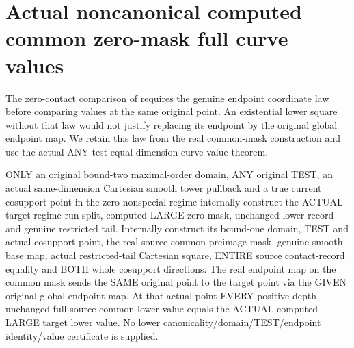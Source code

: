 \section{Actual noncanonical computed common zero-mask full curve values}

The zero-contact comparison of \cite[Section~5, Step~I.B]{bierstone-milman08-functoriality}
requires the genuine endpoint coordinate law before comparing values at
the same original point. An existential lower square without that law
would not justify replacing its endpoint by the original global endpoint
map. We retain this law from the real common-mask construction and use
the actual ANY-test equal-dimension curve-value theorem.

\begin{theorem}
\label{hir:original-any-test-zero-common-curve-full-values}
\leanok
ONLY an original bound-two maximal-order domain, ANY original TEST, an
actual same-dimension Cartesian smooth tower pullback and a true current
cosupport point in the zero nonspecial regime internally construct the
ACTUAL target regime-run split, computed LARGE zero mask, unchanged lower
record and genuine restricted tail. Internally construct its bound-one
domain, TEST and actual cosupport point, the real source common preimage
mask, genuine smooth base map, actual restricted-tail Cartesian square,
ENTIRE source contact-record equality and BOTH whole cosupport directions.
The real endpoint map on the common mask sends the SAME original point
to the target point via the GIVEN original global endpoint map. At that
actual point EVERY positive-depth unchanged full source-common lower
value equals the ACTUAL computed LARGE target lower value. No lower
canonicality/domain/TEST/endpoint identity/value certificate is supplied.
\end{theorem}
